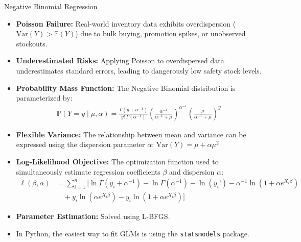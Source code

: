 \documentclass[11pt]{beamer}
\begin{document}
\begin{frame}[allowframebreaks]{Negative Binomial Regression}
\begin{small}
\begin{itemize}
\item \textbf{Poisson Failure:} Real-world inventory data exhibits overdispersion ($\text{Var}(Y) > \mathbb{E}(Y)$) due to bulk buying, promotion spikes, or unobserved stockouts.
\item \textbf{Underestimated Risks:} Applying Poisson to overdispersed data underestimates standard errors, leading to dangerously low safety stock levels. 
\item \textbf{Probability Mass Function:} The Negative Binomial distribution is parameterized by:
\begin{align*}
\mathbb{P}(Y=y\mid \mu ,\alpha )=\frac{\Gamma (y+\alpha ^{-1})}{y!\,\Gamma (\alpha ^{-1})}\left(\frac{\alpha ^{-1}}{\alpha ^{-1}+\mu }\right)^{\alpha ^{-1}}\left(\frac{\mu }{\alpha ^{-1}+\mu }\right)^{y}
\end{align*}
\item \textbf{Flexible Variance:} The relationship between mean and variance can be expressed using the dispersion parameter $\alpha$: $\text{Var}(Y)=\mu +\alpha \mu ^{2}$
\item \textbf{Log-Likelihood Objective:} The optimization function used to simultaneously estimate regression coefficients $\beta$ and dispersion $\alpha$:
\begin{align*}
\ell (\beta ,\alpha ) &=\sum _{i=1}^{n}\Big[\ln \Gamma (y_{i}+\alpha ^{-1})-\ln \Gamma (\alpha ^{-1})-\ln (y_{i}!)-\alpha ^{-1}\ln (1+\alpha e^{X_{i}\beta }) \\ &\quad + y_{i}\ln (\alpha e^{X_{i}\beta })-y_{i}\ln (1+\alpha e^{X_{i}\beta })\Big]
\end{align*}
\item \textbf{Parameter Estimation:} Solved using L-BFGS. 
\item In Python, the easiest way to fit GLMs is using the \texttt{statsmodels} package.
\end{itemize}
\end{small}
\end{frame}
\end{document}
